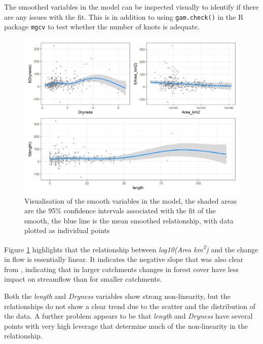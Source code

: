 \documentclass[]{elsarticle} %
\begin{document}
The smoothed variables in the model can be inspected visually to identify if there are any issues with the fit. This is in addition to using \texttt{gam.check()} in the R package \texttt{mgcv} to test whether the number of knots is adequate.

\begin{figure}
\includegraphics[width=0.9\linewidth]{Forest_model_allsmooths} \caption{Visualisation of the smooth variables in the model, the shaded areas are the 95\% confidence intervals associated with the fit of the smooth, the blue line is the mean smoothed relationship, with data plotted as individual points}\label{fig:smoothsmodelall}
\end{figure}

Figure \ref{fig:smoothsmodelall} highlights that the relationship between \emph{log10(Area km\textsuperscript{2})} and the change in flow is essentially linear. It indicates the negative slope that was also clear from \citet{zhang2017}, indicating that in larger catchments changes in forest cover have less impact on streamflow than for smaller catchments.

Both the \emph{length} and \emph{Dryness} variables show strong non-linearity, but the relationships do not show a clear trend due to the scatter and the distribution of the data. A further problem appears to be that \emph{length} and \emph{Dryness} have several points with very high leverage that determine much of the non-linearity in the relationship.
\end{document}
